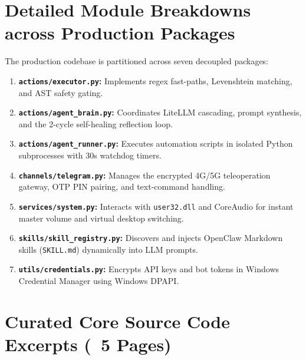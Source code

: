 \documentclass[12pt,letterpaper,oneside]{report}
\begin{document}
\section{Detailed Module Breakdowns across Production Packages}
The production codebase is partitioned across seven decoupled packages:
\begin{enumerate}
    \item \textbf{\texttt{actions/executor.py}:} Implements regex fast-paths, Levenshtein matching, and AST safety gating.
    \item \textbf{\texttt{actions/agent\_brain.py}:} Coordinates LiteLLM cascading, prompt synthesis, and the 2-cycle self-healing reflection loop.
    \item \textbf{\texttt{actions/agent\_runner.py}:} Executes automation scripts in isolated Python subprocesses with 30s watchdog timers.
    \item \textbf{\texttt{channels/telegram.py}:} Manages the encrypted 4G/5G teleoperation gateway, OTP PIN pairing, and text-command handling.
    \item \textbf{\texttt{services/system.py}:} Interacts with \texttt{user32.dll} and CoreAudio for instant master volume and virtual desktop switching.
    \item \textbf{\texttt{skills/skill\_registry.py}:} Discovers and injects OpenClaw Markdown skills (\texttt{SKILL.md}) dynamically into LLM prompts.
    \item \textbf{\texttt{utils/credentials.py}:} Encrypts API keys and bot tokens in Windows Credential Manager using Windows DPAPI.
\end{enumerate}

\section{Curated Core Source Code Excerpts (~5 Pages)}
\end{document}
